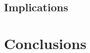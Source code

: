 \documentclass[english, oneside]{HYgradu}
\begin{document}
\section{Implications}


\chapter{Conclusions}



\newcommand{\apj}{The Astrophysical Journal}
\newcommand{\mnras}{Monthly Notices of the Royal Astronomical Society}
\newcommand{\apjs}{The Astrophysical Journal Supplement}
\newcommand{\nat}{Nature}
\newcommand{\aj}{The Astronomical Journal}

\clearpage
{} %


\end{document}
